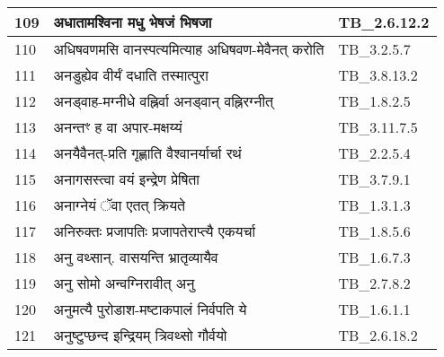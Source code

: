 \documentclass[17pt]{extarticle}
\begin{document}
\begin{longtable}{||p{0.4in}||p{4.9in}||p{0.9in}||}
    109 & अधातामश्विना मधु भेषजं भिषजा & TB\_2.6.12.2       \\
    
    \hline
        
    110 & अधिषवणमसि वानस्पत्यमित्याह अधिषवण{-}मेवैनत् करोति & TB\_3.2.5.7       \\
    
    \hline
        
    111 & अनडुह्येव वीर्यं दधाति तस्मात्पुरा & TB\_3.8.13.2       \\
    
    \hline
        
    112 & अनड्वाह{-}मग्नीधे वह्निर्वा अनड्वान् वह्निरग्नीत् & TB\_1.8.2.5       \\
    
    \hline
        
    113 & अनन्तꣳ ह वा अपार{-}मक्षय्यं & TB\_3.11.7.5       \\
    
    \hline
        
    114 & अनयैवैनत्{-}प्रति गृह्णाति वैश्वानर्यार्चा रथं & TB\_2.2.5.4       \\
    
    \hline
        
    115 & अनागसस्त्वा वयं इन्द्रेण प्रेषिता & TB\_3.7.9.1       \\
    
    \hline
        
    116 & अनाग्नेयं ॅवा एतत् क्रियते & TB\_1.3.1.3       \\
    
    \hline
        
    117 & अनिरुक्तः प्रजापतिः प्रजापतेराप्त्यै एकयर्चा & TB\_1.8.5.6       \\
    
    \hline
        
    118 & अनु वथ्सान्. वासयन्ति भ्रातृव्यायैव & TB\_1.6.7.3       \\
    
    \hline
        
    119 & अनु सोमो अन्वग्निरावीत् अनु & TB\_2.7.8.2       \\
    
    \hline
        
    120 & अनुमत्यै पुरोडाश{-}मष्टाकपालं निर्वपति ये & TB\_1.6.1.1       \\
    
    \hline
        
    121 & अनुष्टुप्छन्द इन्द्रियम् त्रिवथ्सो गौर्वयो & TB\_2.6.18.2       \\
    

\end{longtable}
\end{document}
